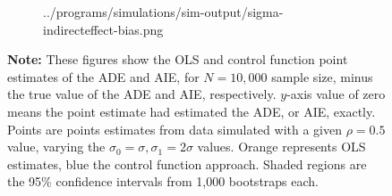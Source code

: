 \begin{figure}[h!]
\begin{subfigure}[c]{0.475\textwidth}
{            ../programs/simulations/sim-output/sigma-indirecteffect-bias.png}
    \end{subfigure}
    \label{fig:sigma-bias}
    \justify
    \footnotesize    
    \textbf{Note:}
    These figures show the OLS and control function point estimates of the ADE and AIE, for $N = 10,000$ sample size, minus the true value of the ADE and AIE, respectively.
    $y$-axis value of zero means the point estimate had estimated the ADE, or AIE, exactly.
    Points are points estimates from data simulated with a given $\rho = 0.5$ value, varying the $\sigma_0 = \sigma, \sigma_1 = 2\sigma$ values.
    Orange represents OLS estimates, blue the control function approach.
    Shaded regions are the 95\% confidence intervals from 1,000 bootstraps each.
\end{figure}

